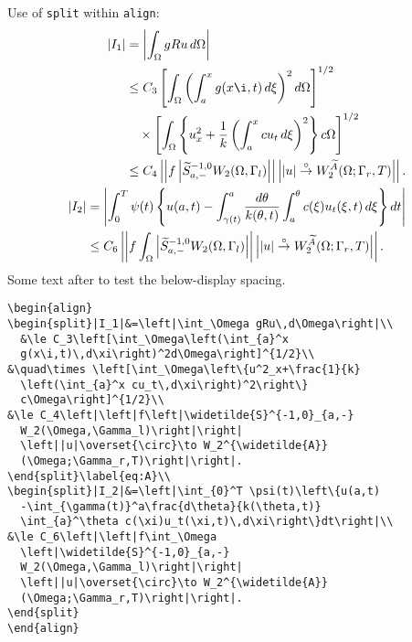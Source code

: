 \newpage
Use of {\tt split} within {\tt align}:
{
\begin{align}
\begin{split}|I_1|&=\left|\int_\Omega gRu\,d\Omega\right|\\
  &\le C_3\left[\int_\Omega\left(\int_{a}^x
  g(x\i,t)\,d\xi\right)^2d\Omega\right]^{1/2}\\
&\quad\times \left[\int_\Omega\left\{u^2_x+\frac{1}{k}
  \left(\int_{a}^x cu_t\,d\xi\right)^2\right\}
  c\Omega\right]^{1/2}\\
&\le C_4\left|\left|f\left|\widetilde{S}^{-1,0}_{a,-}
  W_2(\Omega,\Gamma_l)\right|\right|
  \left||u|\overset{\circ}\to W_2^{\widetilde{A}}
  (\Omega;\Gamma_r,T)\right|\right|.
\end{split}\label{eq:A}\\
\begin{split}|I_2|&=\left|\int_{0}^T \psi(t)\left\{u(a,t)
  -\int_{\gamma(t)}^a\frac{d\theta}{k(\theta,t)}
  \int_{a}^\theta c(\xi)u_t(\xi,t)\,d\xi\right\}dt\right|\\
&\le C_6\left|\left|f\int_\Omega
 \left|\widetilde{S}^{-1,0}_{a,-}
  W_2(\Omega,\Gamma_l)\right|\right|
  \left||u|\overset{\circ}\to W_2^{\widetilde{A}}
  (\Omega;\Gamma_r,T)\right|\right|.
\end{split}
\end{align}}%
Some text after to test the below-display spacing.

\begin{verbatim}
\begin{align}
\begin{split}|I_1|&=\left|\int_\Omega gRu\,d\Omega\right|\\
  &\le C_3\left[\int_\Omega\left(\int_{a}^x
  g(x\i,t)\,d\xi\right)^2d\Omega\right]^{1/2}\\
&\quad\times \left[\int_\Omega\left\{u^2_x+\frac{1}{k}
  \left(\int_{a}^x cu_t\,d\xi\right)^2\right\}
  c\Omega\right]^{1/2}\\
&\le C_4\left|\left|f\left|\widetilde{S}^{-1,0}_{a,-}
  W_2(\Omega,\Gamma_l)\right|\right|
  \left||u|\overset{\circ}\to W_2^{\widetilde{A}}
  (\Omega;\Gamma_r,T)\right|\right|.
\end{split}\label{eq:A}\\
\begin{split}|I_2|&=\left|\int_{0}^T \psi(t)\left\{u(a,t)
  -\int_{\gamma(t)}^a\frac{d\theta}{k(\theta,t)}
  \int_{a}^\theta c(\xi)u_t(\xi,t)\,d\xi\right\}dt\right|\\
&\le C_6\left|\left|f\int_\Omega
  \left|\widetilde{S}^{-1,0}_{a,-}
  W_2(\Omega,\Gamma_l)\right|\right|
  \left||u|\overset{\circ}\to W_2^{\widetilde{A}}
  (\Omega;\Gamma_r,T)\right|\right|.
\end{split}
\end{align}
\end{verbatim}

